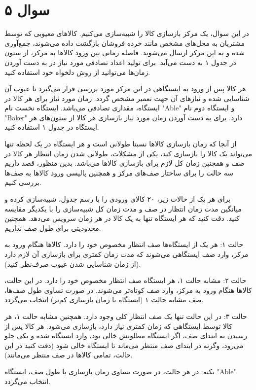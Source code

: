 \section*{سوال ۵}

در این سوال، یک مرکز بازسازی کالا را شبیه‌سازی می‌کنیم. کالاهای معیوبی که توسط مشتریان به محل‌های مشخص مانند خرده فروشان بازگشت داده می‌شوند، جمع‌آوری شده و به این مرکز ارسال می‌شوند. فاصله زمانی بین ورود کالاها به مرکز، از ستون 
در جدول ۱ به دست می‌آید. برای تولید اعداد تصادفی مورد نیاز در به دست آوردن زمان‌ها می‌توانید از روش دلخواه خود استفاده کنید.

هر کالا پس از ورود به ایستگاهی در این مرکز مورد بررسی قرار می‌گیرد تا عیوب آن شناسایی شده و نیازهای آن جهت تعمیر مشخص گردد. زمان مورد نیاز برای هر کالا در ایستگاه، مقداری تصادفی می‌باشد. ایستگاه نخست نام "Able" و ایستگاه دوم نام "Baker" دارد. برای به دست آوردن زمان مورد نیاز بازسازی هر کالا از ستون‌های هر ایستگاه در جدول ۱ استفاده کنید.

از آنجا که زمان بازسازی کالاها نسبتا طولانی است و هر ایستگاه در یک لحظه تنها می‌تواند یک کالا را بازسازی کند، یکی از مشکلات، طولانی شدن زمان انتظار هر کالا در صف و همچنین زمان کل لازم برای بازسازی کالاها می‌باشد. بدین منظور، قصد داریم سه حالت را برای ساختار صف‌های مرکز و همچنین پالیسی ورود کالاها به صف‌ها بررسی کنیم.

برای هر یک از حالات زیر، ۲۰ کالای ورودی را با رسم جدول، شبیه‌سازی کرده و میانگین مدت زمان انتظار در صف و مدت زمان کل شبیه‌سازی را با یکدیگر مقایسه کنید. دقت کنید که هر ایستگاه تنها به یک کالا در هر زمان سرویس می‌دهد. همچنین محدودیتی برای طول صف نداریم.

حالت ۱: هر یک از ایستگاه‌ها صف انتظار مخصوص خود را دارد. کالاها هنگام ورود به مرکز، وارد صف ایستگاهی می‌شوند که مدت زمان کمتری برای بازسازی آن لازم دارد (از زمان شناسایی شدن عیوب صرف‌نظر کنید).

حالت ۲: مشابه حالت ۱، هر ایستگاه صف انتظار مخصوص خود را دارد. در این حالت، کالاها هنگام ورود به مرکز، وارد صف کوتاه‌تر می‌شوند. در صورت تساوی طول صف‌ها، صف مشابه حالت ۱ (ایستگاه با زمان بازسازی کم‌تر) انتخاب می‌گردد.

حالت ۳: در این حالت تنها یک صف انتظار کلی وجود دارد. همچنین مشابه حالت ۱، هر کالا توسط ایستگاهی که زمان کمتری نیاز دارد، بازسازی می‌شود. هر کالا پس از رسیدن به ابتدای صف، اگر ایستگاه مطلوبش خالی بود، وارد ایستگاه شده و یکی جلو می‌رود، وگرنه در ابتدای صف منتظر می‌ماند تا ایستگاه خالی شود (دقت کنید در این حالت، تمامی کالاها در صف منتظر می‌مانند).

نکته: در هر حالت، در صورت تساوی زمان بازسازی یا طول صف، ایستگاه "Able" انتخاب می‌گردد.

